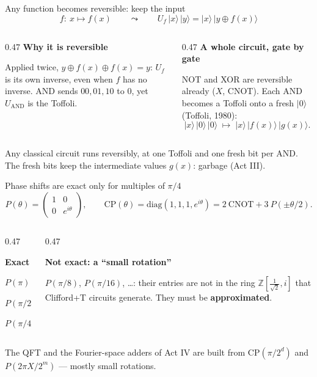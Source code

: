 \documentclass[aspectratio=169,11pt]{beamer}
\newcommand{\blocktitle}[1]{{\bfseries #1}\par\vskip1mm}
\newcommand{\peachtitle}[1]{{\bfseries\color{cverm}#1}\par\vskip1mm}
\begin{document}
\begin{frame}{Any function becomes reversible: keep the input}
  \[ f:\ x\mapsto f(x)\qquad\leadsto\qquad U_f\,|x\rangle\,|y\rangle=|x\rangle\,|y\oplus f(x)\rangle \]
  \vskip1mm
  \begin{columns}[T]
    \begin{column}{0.47\textwidth}
      \blocktitle{Why it is reversible}
      Applied twice, $y\oplus f(x)\oplus f(x)=y$: $U_f$ is its own inverse, even when $f$ has no inverse. AND sends $00,01,10$ to $0$, yet $U_{\mathrm{AND}}$ is the Toffoli.
    \end{column}
    \begin{column}{0.47\textwidth}
      \blocktitle{A whole circuit, gate by gate}
      NOT and XOR are reversible already ($X$, CNOT). Each AND becomes a Toffoli onto a fresh $|0\rangle$ (Toffoli, 1980):
      \[ |x\rangle\,|0\rangle\,|0\rangle\;\mapsto\;|x\rangle\,|f(x)\rangle\,|g(x)\rangle . \]
    \end{column}
  \end{columns}
  \begin{takeaway}Any classical circuit runs reversibly, at one Toffoli and one fresh bit per AND. The fresh bits keep the intermediate values $g(x)$: garbage (Act III).\end{takeaway}
\end{frame}

\begin{frame}{Phase shifts are exact only for multiples of $\pi/4$}
  \[
    P(\theta)=\begin{pmatrix}1&0\\0&e^{i\theta}\end{pmatrix},\qquad
    \mathrm{CP}(\theta)=\mathrm{diag}(1,1,1,e^{i\theta}) = 2\ \mathrm{CNOT} + 3\ P(\pm\theta/2).
  \]
  \begin{columns}[T]
    \begin{column}{0.47\textwidth}
      \begin{greyblock}
        \blocktitle{Exact}
        $P(\pi)=Z$\par $P(\pi/2)=S$\par $P(\pi/4)=T$
      \end{greyblock}
    \end{column}
    \begin{column}{0.47\textwidth}
      \begin{peachblock}
        \peachtitle{Not exact: a ``small rotation''}
        $P(\pi/8)$, $P(\pi/16)$, \dots: their entries are not in the ring $\mathbb{Z}[\tfrac{1}{\sqrt2},i]$ that Clifford+T circuits generate. They must be \textbf{approximated}.
      \end{peachblock}
    \end{column}
  \end{columns}
  \begin{takeaway}The QFT and the Fourier-space adders of Act IV are built from $\mathrm{CP}(\pi/2^d)$ and $P(2\pi X/2^m)$ --- mostly small rotations.\end{takeaway}
\end{frame}
\end{document}
